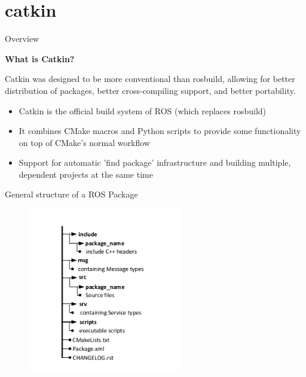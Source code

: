 \documentclass{beamer}
\begin{document}
\section{catkin\cite{ROS:2015:Online}}
\begin{frame}{Overview}
 \begin{large}\textbf{What is Catkin?}\end{large}
  \begin{definition}
   Catkin was designed to be more conventional than rosbuild, allowing for better distribution of packages, better cross-compiling support, and better portability.
  \end{definition}
\begin{itemize}
 \item Catkin is the official build system of ROS (which replaces rosbuild)
 \item It combines CMake macros and Python scripts to provide some functionality on top of CMake's normal workflow
 \item Support for automatic 'find package' infrastructure and building multiple, dependent projects at the same time
 \end{itemize}
\end{frame}
\begin{frame}{General structure of a ROS Package}
\begin{figure}
  \includegraphics[width=0.6\textwidth]{./images/structure.pdf}
\end{figure}
\end{frame}
\end{document}
